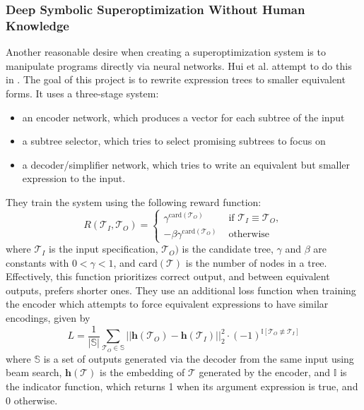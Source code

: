 \documentclass[12pt,twoside]{reedthesis}
\begin{document}
    \subsubsection{Deep Symbolic Superoptimization Without Human Knowledge}
        Another reasonable desire when creating a superoptimization system is to manipulate programs directly via neural networks.
        Hui et al. attempt to do this in \cite{hui2020deep}. 
        The goal of this project is to rewrite expression trees to smaller equivalent forms. 
        It uses a three-stage system:
        \begin{itemize}
            \item an encoder network\footnotemark, which produces a vector for each subtree of the input
            \item a subtree selector, which tries to select promising subtrees to focus on
            \item a decoder/simplifier network, which tries to write an equivalent but smaller expression to the input.
        \end{itemize}
            
            
        They train the system using the following reward function:
        \[
            R(\mathcal{T}_I,\mathcal{T}_O) =
                \begin{cases}
                    \gamma^{\text{card}(\mathcal{T}_O)} & \text{ if } \mathcal{T}_I \equiv \mathcal{T}_O,
                \\ -\beta\gamma^{\text{card}(\mathcal{T}_O)} & \text{ otherwise}
                \end{cases}
        \] %
        where $\mathcal{T}_I$ is the input specification, $\mathcal{T}_O)$ is the candidate tree, $\gamma$ and $\beta$ are constants with $0 < \gamma < 1$, and $\text{card}(\mathcal{T})$ is the number of nodes in a tree.
        Effectively, this function prioritizes correct output, and between equivalent outputs, prefers shorter ones.
        They use an additional loss function when training the encoder which attempts to force equivalent expressions to have similar encodings, given by
        \[
            L = \frac{1}{|\mathbb{S}|} \sum_{\mathcal{T}_O \in \mathbb{S}} || \boldsymbol{h}(\mathcal{T}_O) - \boldsymbol{h}(\mathcal{T}_I) ||^2_2 \cdot (-1)^{\mathbb{I}[\mathcal{T}_O \not\equiv \mathcal{T}_I]}
        \]
        where $\mathbb{S}$ is a set of outputs generated via the decoder from the same input using beam search\footnotemark, $\boldsymbol{h}(\mathcal{T})$ is the embedding of $\mathcal{T}$ generated by the encoder, and $\mathbb{I}$ is the indicator function, which returns 1 when its argument expression is true, and 0 otherwise.
            
\end{document}

